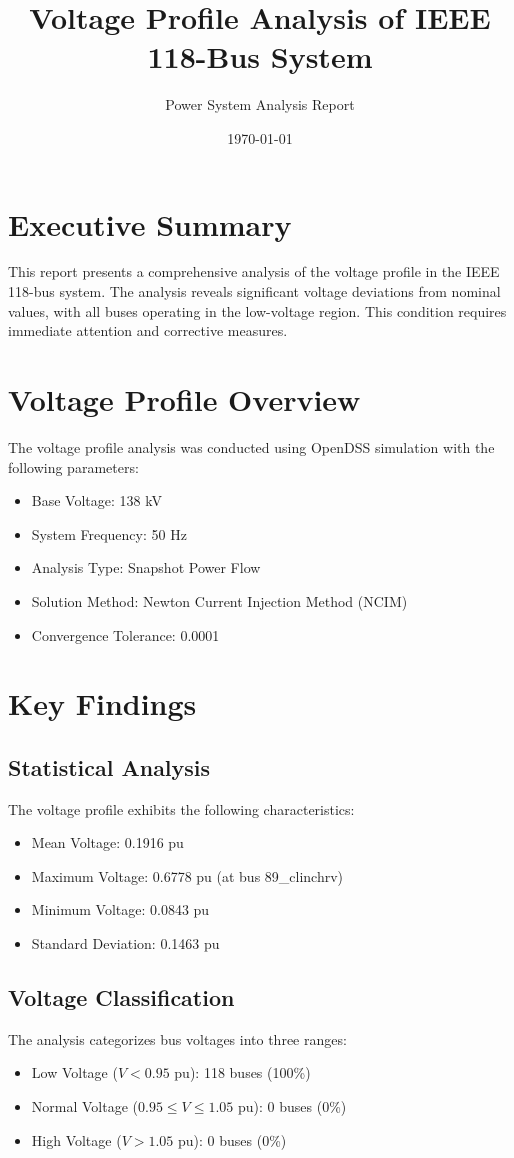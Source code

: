 \documentclass[11pt]{article}
\title{Voltage Profile Analysis of IEEE 118-Bus System}
\author{Power System Analysis Report}
\date{\today}
\begin{document}
\maketitle

\section{Executive Summary}
This report presents a comprehensive analysis of the voltage profile in the IEEE 118-bus system. The analysis reveals significant voltage deviations from nominal values, with all buses operating in the low-voltage region. This condition requires immediate attention and corrective measures.

\section{Voltage Profile Overview}
The voltage profile analysis was conducted using OpenDSS simulation with the following parameters:
\begin{itemize}
    \item Base Voltage: 138 kV
    \item System Frequency: 50 Hz
    \item Analysis Type: Snapshot Power Flow
    \item Solution Method: Newton Current Injection Method (NCIM)
    \item Convergence Tolerance: 0.0001
\end{itemize}

\section{Key Findings}
\subsection{Statistical Analysis}
The voltage profile exhibits the following characteristics:
\begin{itemize}
    \item Mean Voltage: 0.1916 pu
    \item Maximum Voltage: 0.6778 pu (at bus 89\_clinchrv)
    \item Minimum Voltage: 0.0843 pu
    \item Standard Deviation: 0.1463 pu
\end{itemize}

\subsection{Voltage Classification}
The analysis categorizes bus voltages into three ranges:
\begin{itemize}
    \item Low Voltage ($V < 0.95$ pu): 118 buses (100\%)
    \item Normal Voltage ($0.95 \leq V \leq 1.05$ pu): 0 buses (0\%)
    \item High Voltage ($V > 1.05$ pu): 0 buses (0\%)
\end{itemize}
\end{document}
